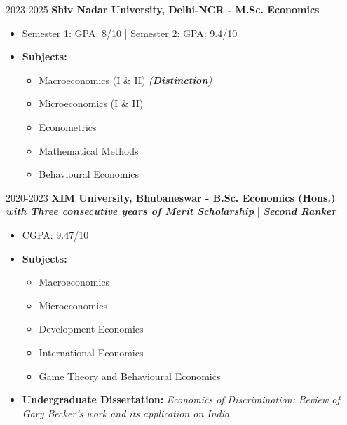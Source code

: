 \datedsubsection{ }
    {%
        2023-2025}
    {%
        \textbf{Shiv Nadar University, Delhi-NCR - M.Sc. Economics}}
    {%
    \begin{itemize}[leftmargin=*]
        \item Semester 1: GPA: 8/10 | Semester 2: GPA: 9.4/10
        \item \textbf{Subjects:}
        \begin{itemize}[leftmargin=*]
            \item Macroeconomics (I \& II) \textit{(\textbf{Distinction})}
            \item Microeconomics (I \& II)
            \item Econometrics
            \item Mathematical Methods
            \item Behavioural Economics 
        \end{itemize}
    \end{itemize}
  }

\datedsubsection{ }
    {%
        2020-2023}
    {%
        \textbf{XIM University, Bhubaneswar - B.Sc. Economics (Hons.)}\\
        \hspace{0.5cm} \textbf{\textit{with Three consecutive years of Merit Scholarship}} | \textbf{\textit{Second Ranker}}}
    {%
    \begin{itemize}[leftmargin=*]
        \item CGPA: 9.47/10
        \item \textbf{Subjects:}
        \begin{itemize}[leftmargin=*]
            \item Macroeconomics
            \item Microeconomics 
            \item Development Economics 
            \item International Economics
            \item Game Theory and Behavioural Economics
        \end{itemize}
        \item \textbf{Undergraduate Dissertation:} \textit{Economics of Discrimination: Review of Gary Becker’s work and its application on India}
    \end{itemize}
  }
